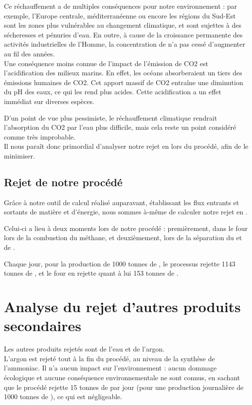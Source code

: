 \documentclass[10pt, a4paper, oneside]{scrartcl}
\begin{document}
Ce réchauffement a de multiples conséquences pour notre environnement : par exemple, l'Europe centrale, méditerranéenne ou encore les régions du Sud-Est sont les zones plus vulnérables au changement climatique, et sont sujettes à des sécheresses et pénuries d'eau. En outre, à cause de la croissance permanente des activités industrielles de l'Homme, la concentration de  n'a pas cessé d'augmenter au fil des années.
\\

Une conséquence moins connue de l’impact de l’émission de CO2 est l’acidification des milieux marins. En effet, les océans absorberaient un tiers des émissions humaines de CO2. Cet apport massif de CO2 entraîne une diminution du pH des eaux, ce qui les rend plus acides. Cette acidification a un effet immédiat sur diverses espèces.

D’un point de vue plus pessimiste, le réchauffement climatique rendrait l’absorption du CO2 par l’eau plus difficile, mais cela reste un point considéré comme très improbable.
\\

Il nous paraît donc primordial d'analyser notre rejet en  lors du procédé, afin de le minimiser.

\subsection{Rejet de notre procédé}
Grâce à notre outil de calcul réalisé auparavant, établissant les flux entrants et sortants de matière et d'énergie, nous sommes à-même de calculer notre rejet en .

Celui-ci a lieu à deux moments lors de notre procédé : premièrement, dans le four lors de la combustion du méthane, et deuxièmement, lors de la séparation du  et de .

Chaque jour, pour la production de 1000 tonnes de , le processus rejette 1143 tonnes de , et le four en rejette quant à lui 153 tonnes de .

\section{Analyse du rejet d'autres produits secondaires}
Les autres produits rejetés sont de l'eau et de l'argon.
\\

L'argon est rejeté tout à la fin du procédé, au niveau de la synthèse de l'ammoniac. Il n'a aucun impact sur l'environnement : aucun dommage écologique et aucune conséquence environnementale ne sont connus, en sachant que le procédé rejette 15 tonnes de  par jour (pour une production journalière de 1000 tonnes de ), ce qui est négligeable.
\\
\end{document}
